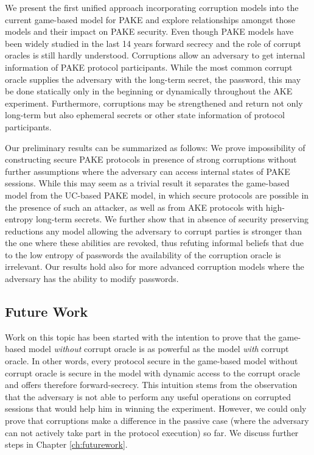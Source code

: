 We present the first unified approach incorporating corruption models into the current game-based model for \ac{PAKE} and explore relationships amongst those models and their impact on \ac{PAKE} security.
Even though \ac{PAKE} models have been widely studied in the last 14 years forward secrecy and the role of corrupt oracles is still hardly understood.
Corruptions allow an adversary to get internal information of \ac{PAKE} protocol participants.
While the most common corrupt oracle supplies the adversary with the long-term secret, the password, this may be done statically only in the beginning or dynamically throughout the \ac{AKE} experiment.
Furthermore, corruptions may be strengthened and return not only long-term but also ephemeral secrets or other state information of protocol participants.

Our preliminary results can be summarized as follows:
We prove impossibility of constructing secure \ac{PAKE} protocols in presence of strong corruptions without further assumptions where the adversary can access internal states of \ac{PAKE} sessions.
While this may seem as a trivial result it separates the game-based model from the \ac{UC}-based \ac{PAKE} model, in which secure protocols are possible in the presence of such an attacker, as well as from \ac{AKE} protocols with high-entropy long-term secrets.
We further show that in absence of security preserving reductions any model allowing the adversary to corrupt parties is stronger than the one where these abilities are revoked, thus refuting informal beliefs that due to the low entropy of passwords the availability of the corruption oracle is irrelevant.
Our results hold also for more advanced corruption models where the adversary has the ability to modify passwords.

\subsection{Future Work}
Work on this topic has been started with the intention to prove that the game-based model \emph{without} corrupt oracle is as powerful as the model \emph{with} corrupt oracle.
In other words, every protocol secure in the game-based model without corrupt oracle is secure in the model with dynamic access to the corrupt oracle and offers therefore forward-secrecy.
This intuition stems from the observation that the adversary is not able to perform any useful operations on corrupted sessions that would help him in winning the experiment.
However, we could only prove that corruptions make a difference in the passive case (where the adversary can not actively take part in the protocol execution) so far.
We discuss further steps in Chapter \ref{ch:futurework}.



